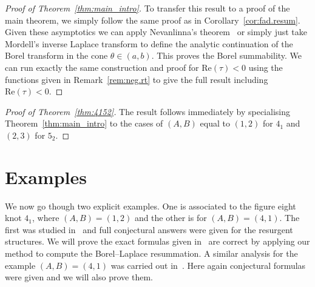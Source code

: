 \documentclass[12pt,reqno]{amsart}
\theoremstyle{definition}
\def\Re{\mathrm{Re}}
\renewcommand{\=}{\;=\;}
\begin{document}
\begin{proof}[Proof of Theorem~\ref{thm:main_intro}]
To transfer this result to a proof of the main theorem, we simply follow the same proof as in Corollary~\ref{cor:fad.resum}. Given these asymptotics we can apply Nevanlinna's theorem~\cite{nevanlinna} or simply just take Mordell's inverse Laplace transform to define the analytic continuation of the Borel transform in the cone $\theta\in(a,b)$. This proves the Borel summability. We can run exactly the same construction and proof for $\Re(\tau)<0$ using the functions given in Remark~\ref{rem:neg.rt} to give the full result including $\Re(\tau)<0$.
\end{proof}
\begin{proof}[Proof of Theorem~\ref{thm:4152}]
The result follows immediately by specialising Theorem~\ref{thm:main_intro} to the cases of $(A,B)$ equal to $(1,2)$ for $4_1$ and $(2,3)$ for $5_2$. 
\end{proof}

\section{Examples}\label{sec:ex}

We now go though two explicit examples. One is associated to the figure eight knot $4_1$, where $(A,B)=(1,2)$ and the other is for $(A,B)=(4,1)$. The first was studied in~\cite{GGM:I} and full conjectural answers were given for the resurgent structures. We will prove the exact formulas given in~\cite{GGM:I} are correct by applying our method to compute the Borel--Laplace resummation. A similar analysis for the example $(A,B)=(4,1)$ was carried out in~\cite{Wh:thesis}. Here again conjectural formulas were given and we will also prove them.
\end{document}
